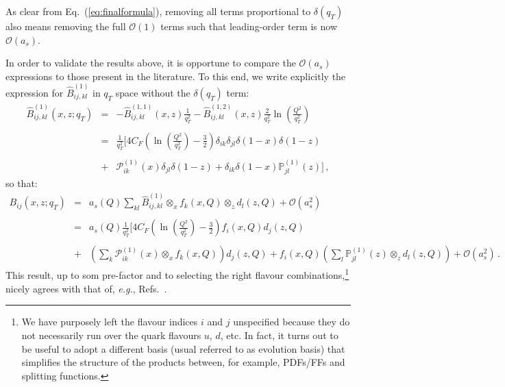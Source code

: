 \documentclass[10pt,a4paper]{article}
\begin{document}
As clear from Eq.~(\ref{eq:finalformula}), removing all terms
proportional to $\delta(q_T)$ also means removing the full
$\mathcal{O}(1)$ terms such that leading-order term is now
$\mathcal{O}(a_s)$.

In order to validate the results above, it is opportune to compare the
$\mathcal{O}(a_s)$ expressions to those present in the literature. To
this end, we write explicitly the expression for
$\hat{B}_{ij,kl}^{(1)}$ in $q_T$ space without the $\delta(q_T)$ term:
\begin{equation}
\begin{array}{rcl}
  \hat{B}_{ij,kl}^{(1)}(x,z;q_T) &=&\displaystyle 
                                     -\hat{B}_{ij,kl}^{(1,1)}(x,z)\frac{1}{q_T^2}
                                     -\hat{B}_{ij,kl}^{(1,2)}(x,z)\frac{2}{q_T^2}\ln\left(\frac{Q^2}{q_T^2}\right)\\
  \\
                                 &=&\displaystyle
                                     \frac{1}{q_T^2}\bigg[4C_F\left(\ln\left(\frac{Q^2}{q_T^2}\right)-\frac{3}{2}\right)\delta_{ik}\delta_{jl}\delta(1-x)\delta(1-z)\\
  \\
                                 &+&\displaystyle \mathcal{P}_{ik}^{(1)}(x)\delta_{jl}\delta(1-z) + \delta_{ik}\delta(1-x)\mathbb{P}_{jl}^{(1)}(z)\bigg]\,,
\end{array}
\end{equation}
so that:
\begin{equation}\label{eq:asymptfromres}
\begin{array}{rcl}
B_{ij}(x,z;q_T) &=&\displaystyle a_s(Q) \sum_{kl}\hat{B}_{ij,kl}^{(1)}\mathop{\otimes}_x
  f_k(x,Q)\mathop{\otimes}_zd_l(z,Q)+\mathcal{O}(a_s^2)\\
\\
&=&\displaystyle a_s(Q) \frac{1}{q_T^2}\bigg[4C_F\left(\ln\left(\frac{Q^2}{q_T^2}\right)-\frac{3}{2}\right) f_i(x,Q)d_j(z,Q)\\
\\
 &+&\displaystyle \left(\sum_{k}\mathcal{P}_{ik}^{(1)}(x) \mathop{\otimes}_x
  f_k(x,Q)\right)d_j(z,Q) + f_i(x,Q)\left(\sum_l\mathbb{P}_{jl}^{(1)}(z) \mathop{\otimes}_zd_l(z,Q)\right) +\mathcal{O}(a_s^2)\,.
\end{array}
\end{equation}
This result, up to som pre-factor and to selecting the right flavour
combinations,\footnote{We have purposely left the flavour indices $i$
  and $j$ unspecified because they do not necessarily run over the
  quark flavours $u$, $d$, etc. In fact, it turns out to be useful to
  adopt a different basis (usual referred to as evolution basis) that
  simplifies the structure of the products between, for example,
  PDFs/FFs and splitting functions.} nicely agrees with that of,
\textit{e.g.},
Refs.~\cite{Meng:1995yn,Nadolsky:1999kb,Collins:2016hqq}.
\end{document}
